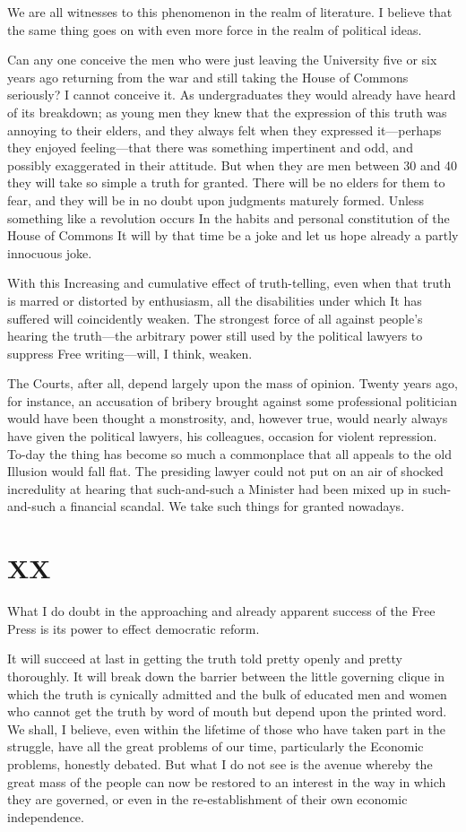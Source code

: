 \documentclass{book}
\begin{document}
We are all witnesses to this phenomenon in the realm of literature. I believe that the same thing goes on with even more force in the realm of political ideas.

Can any one conceive the men who were just leaving the University five or six years ago returning from the war and still taking the House of Commons seriously? I cannot conceive it. As undergraduates they would already have heard of its breakdown; as young men they knew that the expression of this truth was annoying to their elders, and they always felt when they expressed it—perhaps they enjoyed feeling—that there was something impertinent and odd, and possibly exaggerated in their attitude. But when they are men between 30 and 40 they will take so simple a truth for granted. There will be no elders for them to fear, and they will be in no doubt upon judgments maturely formed. Unless something like a revolution occurs In the habits and personal constitution of the House of Commons It will by that time be a joke and let us hope already a partly innocuous joke.

With this Increasing and cumulative effect of truth-telling, even when that truth is marred or distorted by enthusiasm, all the disabilities under which It has suffered will coincidently weaken. The strongest force of all against people’s hearing the truth—the arbitrary power still used by the political lawyers to suppress Free writing—will, I think, weaken.

The Courts, after all, depend largely upon the mass of opinion. Twenty years ago, for instance, an accusation of bribery brought against some professional politician would have been thought a monstrosity, and, however true, would nearly always have given the political lawyers, his colleagues, occasion for violent repression. To-day the thing has become so much a commonplace that all appeals to the old Illusion would fall flat. The presiding lawyer could not put on an air of shocked incredulity at hearing that such-and-such a Minister had been mixed up in such-and-such a financial scandal. We take such things for granted nowadays.

\chapter*{XX}
\label{chapter-21}
What I do doubt in the approaching and already apparent success of the Free Press is its power to effect democratic reform.

It will succeed at last in getting the truth told pretty openly and pretty thoroughly. It will break down the barrier between the little governing clique in which the truth is cynically admitted and the bulk of educated men and women who cannot get the truth by word of mouth but depend upon the printed word. We shall, I believe, even within the lifetime of those who have taken part in the struggle, have all the great problems of our time, particularly the Economic problems, honestly debated. But what I do not see is the avenue whereby the great mass of the people can now be restored to an interest in the way in which they are governed, or even in the re-establishment of their own economic independence.
\end{document}
